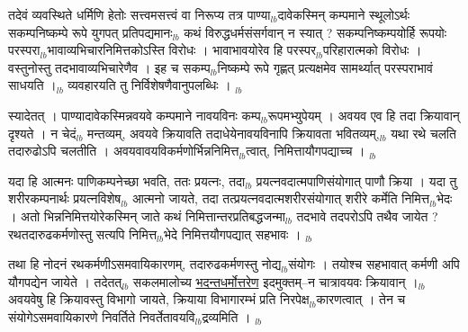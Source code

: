 \documentclass[article,12pt,a4paper]{memoir}%
\newcounter{parCount}
\begin{document}
	  
	  \pstart \leavevmode%
	तदेवं व्यवस्थिते धर्मिणि हेतोः सत्त्वमसत्त्वं वा निरूप्य तत्र पाण्या{\tiny $_{lb}$}दावेकस्मिन् कम्पमाने स्थूलोऽर्थः सकम्पनिष्कम्पे रूपे युगपत् प्रतिपद्यमानः{\tiny $_{lb}$} कथं विरुद्धधर्मसंसर्गवान् न स्यात् ? सकम्पनिष्कम्पयोर्हि रूपयोः परस्परा{\tiny $_{lb}$}भावाव्यभिचारनिमित्तकोऽस्ति विरोधः । भावाभावयोरेव हि परस्पर{\tiny $_{lb}$}परिहारात्मको विरोधः । वस्तुनोस्तु तदभावाव्यभिचारेणैव । इह च सकम्प{\tiny $_{lb}$}निष्कम्पे रूपे गृह्णत् प्रत्यक्षमेव सामर्थ्यात् परस्पराभावं साधयति ।{\tiny $_{lb}$} व्यवहारयति तु निर्विशेषणैवानुपलब्धिः ।
	{}
	\pend%
      {\tiny $_{lb}$}

	  
	  \pstart \leavevmode%
	स्यादेतत् । पाण्यादावेकस्मिन्नवयवे कम्पमाने नावयविनः कम्प{\tiny $_{lb}$}\leavevmode{}रूपमभ्युपेयम् । अवयव एव हि तदा क्रियावान् दृश्यते । न चेदं{\tiny $_{lb}$} मन्तव्यम्, अवयवे क्रियावति तदाधेयेनावयविनापि क्रियावता भवितव्यम्,{\tiny $_{lb}$} यथा रथे चलति तदारुढोऽपि चलतीति । अवयवावयविकर्मणोर्भिन्ननिमित्त{\tiny $_{lb}$}त्वात्, निमित्तायौगपद्याच्च ।
	{}
	\pend%
      {\tiny $_{lb}$}

	  
	  \pstart \leavevmode%
	यदा हि आत्मनः पाणिकम्पनेच्छा भवति, ततः प्रयत्नः, तदा{\tiny $_{lb}$} प्रयत्नवदात्मपाणिसंयोगात् पाणौ क्रिया । यदा तु शरीरकम्पनार्थः प्रयत्नविशेष{\tiny $_{lb}$} आत्मनो जायते, तदा तत्प्रयत्नवदात्मशरीरसंयोगात् शरीरे कर्मेति निमित्त{\tiny $_{lb}$}भेदः । अतो भिन्ननिमित्तयोरेकस्मिन् जाते कथं निमित्तान्तरप्रतिबद्धजन्मा{\tiny $_{lb}$} तदभावे तदपरोऽपि तथैव जायेत ? रथतदारुढकर्मणोस्तु सत्यपि निमित्त{\tiny $_{lb}$}भेदे निमित्तयौगपद्यात् सहभावः ।
	{}
	\pend%
      {\tiny $_{lb}$}

	  
	  \pstart \leavevmode%
	तथा हि नोदनं रथकर्मणीऽसमवायिकारणम्, तदारुढकर्मणस्तु नोद्य{\tiny $_{lb}$}संयोगः । तयोश्च सहभावात् कर्मणी अपि यौगपद्येन जायेते । तदेतत्{\tiny $_{lb}$} \leavevmode{} सकलमालोच्य \uline{भदन्तधर्मोत्तरेण} इदमुक्तम्--न चात्रावयवः क्रियावान् ।{\tiny $_{lb}$} अवयवेषु हि क्रियावस्तु विभागो जायते, क्रियाया विभागारम्भं प्रति निरपेक्ष{\tiny $_{lb}$}कारणत्वात् । तेन च संयोगेऽसमवायिकारणे निवर्तिते निवर्तेतावयवि{\tiny $_{lb}$}द्रव्यमिति ।
	{}
	\pend%
      {\tiny $_{lb}$}
\end{document}
